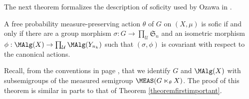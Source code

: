 The next theorem formalizes the description of soficity used by Ozawa in \cite{ozawasoficnotes}.

\begin{theorem}\label{theoremrewriesoficactionintermsofcovariant}
A free probability measure-preserving action $\theta$ of $G$ on $(X,\mu)$ is sofic if and only if there are a group morphism $\sigma:G\to\prod_\mathcal{U}\mathfrak{S}_n$ and an isometric morphism $\phi:\MAlg(X)\to\prod_\mathcal{U}\MAlg(Y_{n_k})$ such that $(\sigma,\phi)$ is covariant with respect to the canonical actions.
\end{theorem}

Recall, from the conventions in page \pageref{conventionssoficactions}, that we identify $G$ and $\MAlg(X)$ with subsemigroups of the measured semigroup $\MEAS(G\ltimes_\theta X)$. The proof of this theorem is similar in parts to that of Theorem \ref{theoremfirstimportant}.

